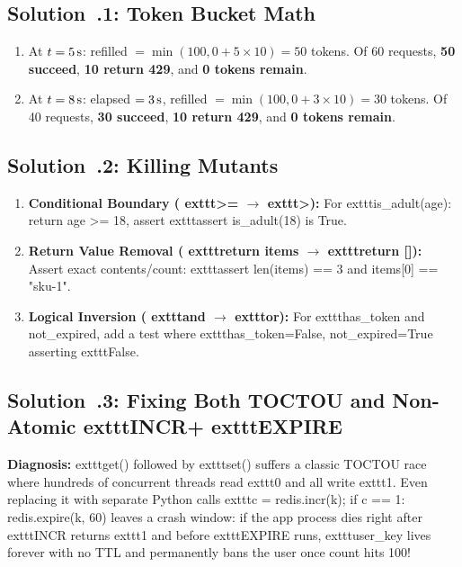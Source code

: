 \subsection{Solution~\thechapter.1: Token Bucket Math}
\begin{enumerate}[leftmargin=15pt]
  \item At $t = 5\text{\,s}$: refilled $= \min(100, 0 + 5 \times 10) = 50$ tokens. Of 60 requests, \textbf{50 succeed}, \textbf{10 return 429}, and \textbf{0 tokens remain}.
  \item At $t = 8\text{\,s}$: elapsed $= 3\text{\,s}$, refilled $= \min(100, 0 + 3 \times 10) = 30$ tokens. Of 40 requests, \textbf{30 succeed}, \textbf{10 return 429}, and \textbf{0 tokens remain}.
\end{enumerate}

\subsection{Solution~\thechapter.2: Killing Mutants}
\begin{enumerate}[leftmargin=15pt]
  \item \textbf{Conditional Boundary (	exttt{>=} $\to$ 	exttt{>}):} For 	exttt{is\_adult(age): return age >= 18}, assert 	exttt{assert is\_adult(18) is True}.
  \item \textbf{Return Value Removal (	exttt{return items} $\to$ 	exttt{return []}):} Assert exact contents/count: 	exttt{assert len(items) == 3 and items[0] == "sku-1"}.
  \item \textbf{Logical Inversion (	exttt{and} $\to$ 	exttt{or}):} For 	exttt{has\_token and not\_expired}, add a test where 	exttt{has\_token=False, not\_expired=True} asserting 	exttt{False}.
\end{enumerate}

\subsection{Solution~\thechapter.3: Fixing Both TOCTOU and Non-Atomic 	exttt{INCR}+	exttt{EXPIRE}}
\textbf{Diagnosis:} 	exttt{get()} followed by 	exttt{set()} suffers a classic TOCTOU race where hundreds of concurrent threads read 	exttt{0} and all write 	exttt{1}. Even replacing it with separate Python calls 	exttt{c = redis.incr(k); if c == 1: redis.expire(k, 60)} leaves a crash window: if the app process dies right after 	exttt{INCR} returns 	exttt{1} and before 	exttt{EXPIRE} runs, 	exttt{user\_key} lives forever with no TTL and permanently bans the user once count hits 100!

